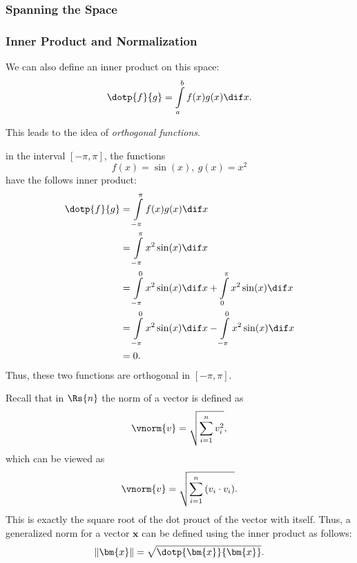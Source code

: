 \subsubsection{Spanning the Space}

\subsubsection{Inner Product and Normalization}
We can also define an inner product on this space:
\begin{equation*}
  \dotp{f}{g} = \int\limits_{a}^{b} f(x)g(x)\dif x.
\end{equation*}

This leads to the idea of \emph{orthogonal functions}. 

\begin{example}
  in the interval $\left[ -\pi, \pi \right]$, the functions
  \begin{equation*}
    f(x)=\sin(x),\ g(x)=x^{2}
  \end{equation*}
  have the follows inner product:
  \begin{align*}
    \dotp{f}{g} &= \int\limits_{-\pi}^{\pi}f(x)g(x)\dif x\\
    &=\int\limits_{-\pi}^{\pi}x^{2}\sin(x)\dif x\\
    &= \int\limits_{-\pi}^{0}x^{2}\sin(x)\dif x + \int\limits_{0}^{\pi}x^{2}\sin(x)\dif x\\
    &= \int\limits_{-\pi}^{0}x^{2}\sin(x)\dif x -\int\limits_{-\pi}^{0}x^{2}\sin(x)\dif x\\
    &= 0.
  \end{align*}
  Thus, these two functions are orthogonal in $\left[ -\pi, \pi \right]$.
\end{example}

Recall that in $\Rs{n}$ the norm of a vector is defined as
\begin{equation*}
  \vnorm{v} = \sqrt{\sum\limits_{i=1}^{n}v_{i}^{2}},
\end{equation*}
which can be viewed as
\begin{equation*}
  \vnorm{v} = \sqrt{\sum\limits_{i=1}^{n}\left(v_{i}\cdot v_{i}\right)}.
\end{equation*}
This is exactly the square root of the dot prouct of the vector with itself. Thus, a generalized norm for a vector $\bm{x}$ can be defined using the inner product as follows:
\begin{equation*}
  \left\| \bm{x} \right\| = \sqrt{\dotp{\bm{x}}{\bm{x}}}.
\end{equation*}


